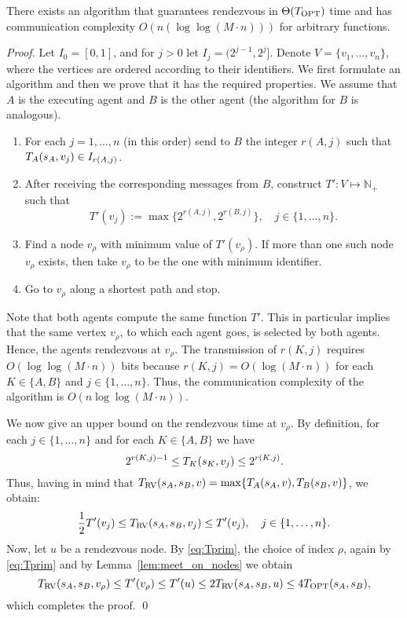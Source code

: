 \documentclass{llncs}
\newcommand{\Topt}[2]{T_{{\scriptsize \textup{OPT}}}(#1,#2)}
\newcommand{\Topts}{T_{\scriptsize \textup{OPT}}}
\newcommand{\dist}[4][]{\if!#1!T_{#2}(#3,#4)\else T_{#2}(#3,#4,#1)\fi}
\newcommand{\TRV}[3]{T_{{\scriptsize \textup{RV}}}(#1,#2,#3)}
\newcommand{\startpos}[1]{s_{#1}}
\newcommand{\starta}{\startpos{A}}
\newcommand{\startb}{\startpos{B}}
\newcommand{\nat}{\mathbb{N}_{+}}
\newcommand{\agentVariable}{K}
\begin{document}
\begin{theorem} \label{thm:arbitrary+comm_compl}
There exists an algorithm 
that guarantees rendezvous in  $\Theta(\Topts)$ time 
and has communication complexity $O(n(\log\log (M \cdot n)))$ for arbitrary functions. 
\end{theorem}
\begin{proof}
Let $I_0=[0,1]$, and for $j>0$ let $I_j=(2^{j-1},2^j]$.
Denote $V=\{v_1,\ldots,v_n\}$, where the vertices are ordered according to their identifiers.
We first formulate an algorithm and then we prove that it has the required properties.
We assume that $A$ is the executing agent and $B$ is the other agent (the algorithm for $B$ is analogous).
\begin{enumerate}
 \item For each $j=1,\ldots,n$ (in this order) send to $B$ the integer $r(A,j)$ such that $\dist{A}{\startpos{A}}{v_j}\in I_{r(A,j)}$.
 \item After receiving the corresponding messages from $B$, construct $T'\colon V\mapsto \nat$ such that
   \[T'(v_j):=\max \{2^{r(A,j)}, 2^{r(B,j)}\}, \quad j\in\{1,\ldots,n\}.\]
 \item Find a node $v_{\rho}$ with minimum value of $T'(v_{\rho})$.
  If more than one such node $v_{\rho}$ exists, then take $v_{\rho}$ to be the one with minimum identifier.
 \item Go to $v_{\rho}$ along a shortest path and stop.
\end{enumerate}

Note that both agents compute the same function $T'$.
This in particular implies that the same vertex $v_{\rho}$, to which each agent goes, is selected by both agents.
Hence, the agents rendezvous at $v_{\rho}$.
The transmission of $r({\agentVariable},j)$ requires $O(\log\log (M \cdot n))$ bits because $r({\agentVariable},j)=O(\log (M \cdot n))$ 
for each ${\agentVariable}\in\{A,B\}$ and $j\in\{1,\ldots,n\}$.
Thus, the communication complexity of the algorithm is $O(n\log\log (M \cdot n))$.

\smallskip
We now give an upper bound on the rendezvous time at $v_{\rho}$. By definition,  for each $j \in\{1,\ldots,n\}$ 
and for each ${\agentVariable}\in\{A,B\}$ we have
\begin{equation*}
2^{r({\agentVariable},j)-1} \leq \dist{\agentVariable}{s_{\agentVariable}}{v_j} \leq 2^{r({\agentVariable},j)}.
\end{equation*}
Thus, having in mind that $\TRV{\starta}{\startb}{v}=\max\{\dist{A}{\starta}{v},\dist{B}{\startb}{v}\}$, we obtain:
\begin{equation} \label{eq:Tprim}
 \frac{1}{2} T'(v_j)\leq \TRV{\starta}{\startb}{v_j} \leq T'(v_j), \quad j\in\{1,\ldots,n\}.
\end{equation}
Now, let $u$ be a rendezvous node. By \eqref{eq:Tprim},  the choice of index $\rho$, again by \eqref{eq:Tprim} and by
Lemma~\ref{lem:meet_on_nodes} we obtain
\begin{equation*}
\TRV{\starta}{\startb}{v_{\rho}} \leq T'(v_{\rho}) \leq T'(u) \leq 2\TRV{\starta}{\startb}{u} \leq
4\Topt{\starta}{\startb},
\end{equation*}
which completes the proof.
\qed\end{proof}
\end{document}

